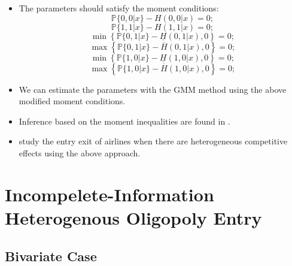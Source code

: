\documentclass[
]{book}
\providecommand{\tightlist}{%
  \setlength{\itemsep}{0pt}\setlength{\parskip}{0pt}}
\begin{document}
\begin{itemize}
\tightlist
\item
  The parameters should satisfy the moment conditions:
  \[
  \mathbb{P}\{0, 0|x\} - H(0, 0|x) = 0;
  \]
  \[
  \mathbb{P}\{1, 1|x\} - H(1, 1|x) = 0;
  \]
  \[
  \min\left\{\mathbb{P}\{0, 1|x\} - \underline{H}(0, 1|x), 0\right\} = 0;
  \]
  \[
  \max\left\{\mathbb{P}\{0, 1|x\} - \overline{H}(0, 1|x), 0\right\} = 0;
  \]
  \[
  \min\left\{\mathbb{P}\{1, 0|x\} - \underline{H}(1, 0|x), 0\right\} = 0;
  \]
  \[
  \max\left\{\mathbb{P}\{1, 0|x\} - \overline{H}(1, 0|x), 0\right\} = 0;
  \]
\item
  We can estimate the parameters with the GMM method using the above modified moment conditions.
\item
  Inference based on the moment inequalities are found in \citet{andrewsInferenceParametersDefined2010}.
\item
  \citet{cilibertoMarketStructureMultiple2009} study the entry exit of airlines when there are heterogeneous competitive effects using the above approach.
\end{itemize}

\hypertarget{incompelete-information-heterogenous-oligopoly-entry}{%
\section{Incompelete-Information Heterogenous Oligopoly Entry}\label{incompelete-information-heterogenous-oligopoly-entry}}

\hypertarget{bivariate-case}{%
\subsection{Bivariate Case}\label{bivariate-case}}
\end{document}
